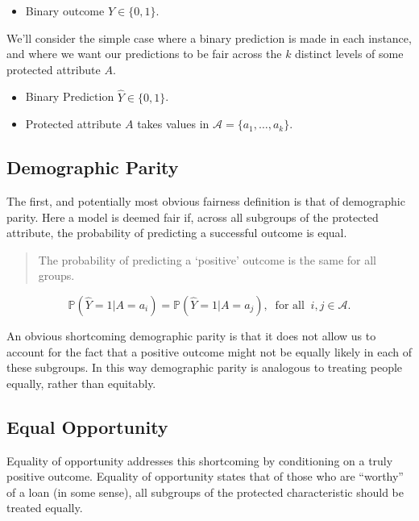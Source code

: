\documentclass[
  letterpaper,
  DIV=11,
  numbers=noendperiod]{scrreprt}
\providecommand{\tightlist}{%
  \setlength{\itemsep}{0pt}\setlength{\parskip}{0pt}}\usepackage{longtable,booktabs,array}
\begin{document}
\begin{itemize}
\tightlist
\item
  Binary outcome \(Y \in \{0,1\}\).
\end{itemize}

We'll consider the simple case where a binary prediction is made in each
instance, and where we want our predictions to be fair across the \(k\)
distinct levels of some protected attribute \(A\).

\begin{itemize}
\tightlist
\item
  Binary Prediction \(\hat Y \in \{0,1\}\).
\item
  Protected attribute \(A\) takes values in
  \(\mathcal{A} = \{a_1, \ldots, a_k\}\).
\end{itemize}

\subsection{Demographic Parity}\label{demographic-parity}

The first, and potentially most obvious fairness definition is that of
demographic parity. Here a model is deemed fair if, across all subgroups
of the protected attribute, the probability of predicting a successful
outcome is equal.

\begin{quote}
The probability of predicting a `positive' outcome is the same for all
groups.
\end{quote}

\[\mathbb{P}(\hat Y = 1 | A = a_i) = \mathbb{P}( \hat Y = 1 | A = a_j), \  \text{ for all }\  i,j \in \mathcal{A}.\]

An obvious shortcoming demographic parity is that it does not allow us
to account for the fact that a positive outcome might not be equally
likely in each of these subgroups. In this way demographic parity is
analogous to treating people equally, rather than equitably.

\subsection{Equal Opportunity}\label{equal-opportunity}

Equality of opportunity addresses this shortcoming by conditioning on a
truly positive outcome. Equality of opportunity states that of those who
are ``worthy'' of a loan (in some sense), all subgroups of the protected
characteristic should be treated equally.
\end{document}

